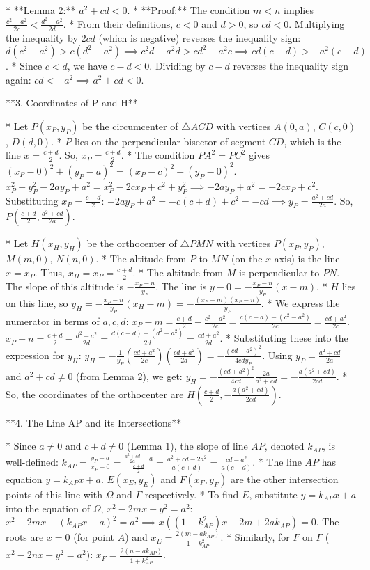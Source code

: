 \documentclass[12pt]{article}
\begin{document}
*   **Lemma 2:** $a^2+cd < 0$.
    *   **Proof:** The condition $m<n$ implies $\frac{c^2-a^2}{2c} < \frac{d^2-a^2}{2d}$.
    *   From their definitions, $c<0$ and $d>0$, so $cd<0$. Multiplying the inequality by $2cd$ (which is negative) reverses the inequality sign:
        $d(c^2-a^2) > c(d^2-a^2) \implies c^2d-a^2d > cd^2-a^2c \implies cd(c-d) > -a^2(c-d)$.
    *   Since $c<d$, we have $c-d<0$. Dividing by $c-d$ reverses the inequality sign again:
        $cd < -a^2 \implies a^2+cd < 0$.

**3. Coordinates of P and H**

*   Let $P(x_P, y_P)$ be the circumcenter of $\triangle ACD$ with vertices $A(0,a)$, $C(c,0)$, $D(d,0)$.
*   $P$ lies on the perpendicular bisector of segment $CD$, which is the line $x = \frac{c+d}{2}$. So, $x_P = \frac{c+d}{2}$.
*   The condition $PA^2 = PC^2$ gives $(x_P-0)^2 + (y_P-a)^2 = (x_P-c)^2 + (y_P-0)^2$.
    $x_P^2 + y_P^2 - 2ay_P + a^2 = x_P^2 - 2cx_P + c^2 + y_P^2 \implies -2ay_P + a^2 = -2cx_P + c^2$.
    Substituting $x_P = \frac{c+d}{2}$: $-2ay_P + a^2 = -c(c+d) + c^2 = -cd \implies y_P = \frac{a^2+cd}{2a}$.
    So, $P\left(\frac{c+d}{2}, \frac{a^2+cd}{2a}\right)$.

*   Let $H(x_H, y_H)$ be the orthocenter of $\triangle PMN$ with vertices $P(x_P, y_P)$, $M(m,0)$, $N(n,0)$.
*   The altitude from $P$ to $MN$ (on the $x$-axis) is the line $x=x_P$. Thus, $x_H = x_P = \frac{c+d}{2}$.
*   The altitude from $M$ is perpendicular to $PN$. The slope of this altitude is $-\frac{x_P-n}{y_P}$. The line is $y-0 = -\frac{x_P-n}{y_P}(x-m)$.
*   $H$ lies on this line, so $y_H = -\frac{x_P-n}{y_P}(x_H-m) = -\frac{(x_P-m)(x_P-n)}{y_P}$.
*   We express the numerator in terms of $a,c,d$:
    $x_P-m = \frac{c+d}{2} - \frac{c^2-a^2}{2c} = \frac{c(c+d)-(c^2-a^2)}{2c} = \frac{cd+a^2}{2c}$.
    $x_P-n = \frac{c+d}{2} - \frac{d^2-a^2}{2d} = \frac{d(c+d)-(d^2-a^2)}{2d} = \frac{cd+a^2}{2d}$.
*   Substituting these into the expression for $y_H$:
    $y_H = -\frac{1}{y_P} \left(\frac{cd+a^2}{2c}\right) \left(\frac{cd+a^2}{2d}\right) = -\frac{(cd+a^2)^2}{4cd y_P}$.
    Using $y_P = \frac{a^2+cd}{2a}$ and $a^2+cd \neq 0$ (from Lemma 2), we get:
    $y_H = -\frac{(cd+a^2)^2}{4cd} \frac{2a}{a^2+cd} = -\frac{a(a^2+cd)}{2cd}$.
*   So, the coordinates of the orthocenter are $H\left(\frac{c+d}{2}, -\frac{a(a^2+cd)}{2cd}\right)$.

**4. The Line AP and its Intersections**

*   Since $a \neq 0$ and $c+d \neq 0$ (Lemma 1), the slope of line $AP$, denoted $k_{AP}$, is well-defined:
    $k_{AP} = \frac{y_P-a}{x_P-0} = \frac{\frac{a^2+cd}{2a}-a}{\frac{c+d}{2}} = \frac{a^2+cd-2a^2}{a(c+d)} = \frac{cd-a^2}{a(c+d)}$.
*   The line $AP$ has equation $y=k_{AP}x+a$. $E(x_E, y_E)$ and $F(x_F, y_F)$ are the other intersection points of this line with $\Omega$ and $\Gamma$ respectively.
*   To find $E$, substitute $y=k_{AP}x+a$ into the equation of $\Omega$, $x^2-2mx+y^2=a^2$:
    $x^2-2mx+(k_{AP}x+a)^2=a^2 \implies x((1+k_{AP}^2)x - 2m + 2ak_{AP})=0$.
    The roots are $x=0$ (for point $A$) and $x_E = \frac{2(m-ak_{AP})}{1+k_{AP}^2}$.
*   Similarly, for $F$ on $\Gamma$ ($x^2-2nx+y^2=a^2$): $x_F = \frac{2(n-ak_{AP})}{1+k_{AP}^2}$.
\end{document}
